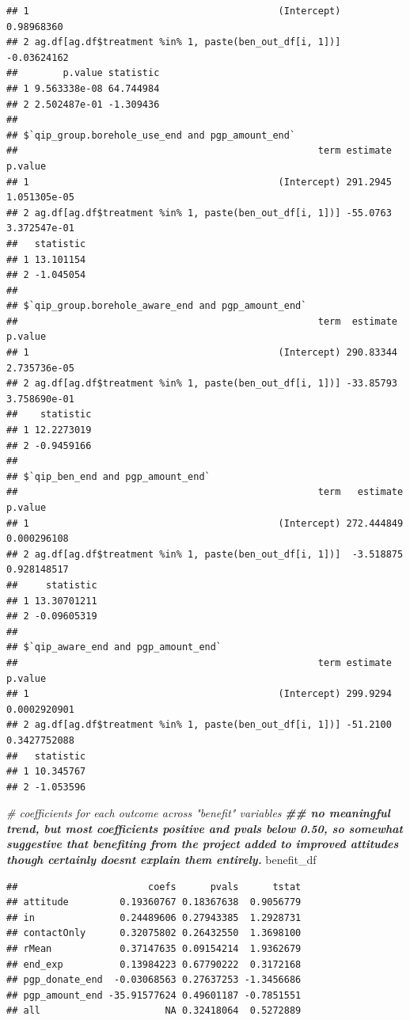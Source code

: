 \documentclass[
]{article}
\newenvironment{Shaded}{\begin{snugshade}}{\end{snugshade}}
\newcommand{\CommentTok}[1]{\textcolor[rgb]{0.56,0.35,0.01}{\textit{#1}}}
\newcommand{\DocumentationTok}[1]{\textcolor[rgb]{0.56,0.35,0.01}{\textbf{\textit{#1}}}}
\newcommand{\NormalTok}[1]{#1}
\begin{document}
\begin{verbatim}
## 1                                            (Intercept)  0.98968360
## 2 ag.df[ag.df$treatment %in% 1, paste(ben_out_df[i, 1])] -0.03624162
##        p.value statistic
## 1 9.563338e-08 64.744984
## 2 2.502487e-01 -1.309436
## 
## $`qip_group.borehole_use_end and pgp_amount_end`
##                                                     term estimate      p.value
## 1                                            (Intercept) 291.2945 1.051305e-05
## 2 ag.df[ag.df$treatment %in% 1, paste(ben_out_df[i, 1])] -55.0763 3.372547e-01
##   statistic
## 1 13.101154
## 2 -1.045054
## 
## $`qip_group.borehole_aware_end and pgp_amount_end`
##                                                     term  estimate      p.value
## 1                                            (Intercept) 290.83344 2.735736e-05
## 2 ag.df[ag.df$treatment %in% 1, paste(ben_out_df[i, 1])] -33.85793 3.758690e-01
##    statistic
## 1 12.2273019
## 2 -0.9459166
## 
## $`qip_ben_end and pgp_amount_end`
##                                                     term   estimate     p.value
## 1                                            (Intercept) 272.444849 0.000296108
## 2 ag.df[ag.df$treatment %in% 1, paste(ben_out_df[i, 1])]  -3.518875 0.928148517
##     statistic
## 1 13.30701211
## 2 -0.09605319
## 
## $`qip_aware_end and pgp_amount_end`
##                                                     term estimate      p.value
## 1                                            (Intercept) 299.9294 0.0002920901
## 2 ag.df[ag.df$treatment %in% 1, paste(ben_out_df[i, 1])] -51.2100 0.3427752088
##   statistic
## 1 10.345767
## 2 -1.053596
\end{verbatim}

\begin{Shaded}
\begin{Highlighting}[]
\CommentTok{\# coefficients for each outcome across "benefit" variables}
\DocumentationTok{\#\# no meaningful trend, but most coefficients positive and pvals below 0.50, so somewhat suggestive that benefiting from the project added to improved attitudes though certainly doesn\textquotesingle{}t explain them entirely.}
\NormalTok{benefit\_df}
\end{Highlighting}
\end{Shaded}

\begin{verbatim}
##                       coefs      pvals      tstat
## attitude         0.19360767 0.18367638  0.9056779
## in               0.24489606 0.27943385  1.2928731
## contactOnly      0.32075802 0.26432550  1.3698100
## rMean            0.37147635 0.09154214  1.9362679
## end_exp          0.13984223 0.67790222  0.3172168
## pgp_donate_end  -0.03068563 0.27637253 -1.3456686
## pgp_amount_end -35.91577624 0.49601187 -0.7851551
## all                      NA 0.32418064  0.5272889
\end{verbatim}
\end{document}
